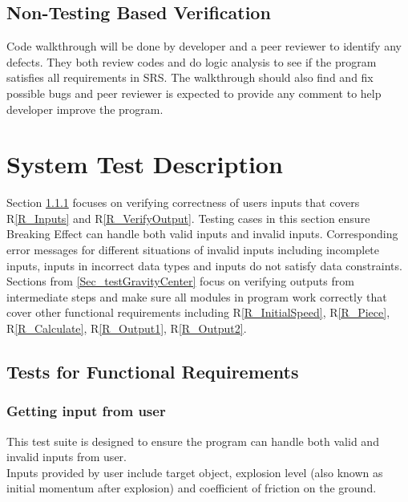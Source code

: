 \documentclass[12pt, titlepage]{article}
\newcommand{\rref}[1]{R\ref{#1}}
\begin{document}

\subsection{Non-Testing Based Verification}
Code walkthrough will be done by developer and a peer reviewer to identify any defects. They both review codes and do logic analysis to see if the program satisfies all requirements in SRS. The walkthrough should also find and fix possible bugs and peer reviewer is expected to provide any comment to help developer improve the program.
\section{System Test Description}

Section \ref{Sec_TestInput} focuses on verifying correctness of users inputs that covers \rref{R_Inputs} and \rref{R_VerifyOutput}. Testing cases in this section ensure Breaking Effect can handle both valid inputs and invalid inputs. Corresponding error messages for different situations of invalid inputs including incomplete inputs, inputs in incorrect data types and inputs do not satisfy data constraints.\\  
Sections from \ref{Sec_testGravityCenter} focus on verifying outputs from intermediate steps and make sure all modules in program work correctly that cover other functional requirements including \rref{R_InitialSpeed}, \rref{R_Piece}, \rref{R_Calculate}, \rref{R_Output1}, \rref{R_Output2}. 


\subsection{Tests for Functional Requirements}

\subsubsection{Getting input from user}
\label{Sec_TestInput}

This test suite is designed to ensure the program can handle both valid and invalid inputs from user.\\ 
Inputs provided by user include target object, explosion level (also known as initial momentum after explosion) and coefficient of friction on the ground. 
		
\end{document}

